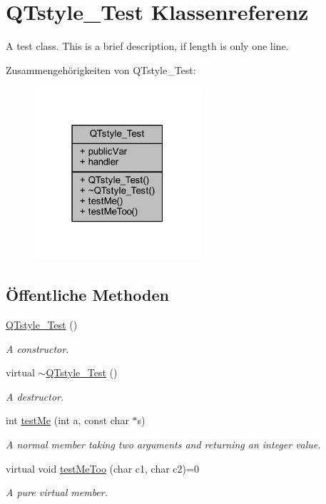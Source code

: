 \hypertarget{class_q_tstyle___test}{}\section{Q\+Tstyle\+\_\+\+Test Klassenreferenz}
\label{class_q_tstyle___test}


A test class. This is a brief description, if length is only one line.  




Zusammengehörigkeiten von Q\+Tstyle\+\_\+\+Test\+:\nopagebreak
\begin{figure}[H]
\begin{center}
\leavevmode
\includegraphics[width=175pt]{class_q_tstyle___test__coll__graph}
\end{center}
\end{figure}
\subsection*{Öffentliche Methoden}
\begin{DoxyCompactItemize}
\item 
\hyperlink{class_q_tstyle___test_a14a296ea4e2ad446712f2310bec60766}{Q\+Tstyle\+\_\+\+Test} ()
\begin{DoxyCompactList}\small\item\em A constructor. \end{DoxyCompactList}\item 
virtual \hyperlink{class_q_tstyle___test_a0ad2e372fe09f34fce46b570b297ae79}{$\sim$\+Q\+Tstyle\+\_\+\+Test} ()
\begin{DoxyCompactList}\small\item\em A destructor. \end{DoxyCompactList}\item 
int \hyperlink{class_q_tstyle___test_a8840748753118dd468e8368a28e49c62}{test\+Me} (int a, const char $\ast$s)
\begin{DoxyCompactList}\small\item\em A normal member taking two arguments and returning an integer value. \end{DoxyCompactList}\item 
virtual void \hyperlink{class_q_tstyle___test_ad5b201f097a720d44bf976c2f27efbda}{test\+Me\+Too} (char c1, char c2)=0
\begin{DoxyCompactList}\small\item\em A pure virtual member. \end{DoxyCompactList}\end{DoxyCompactItemize}
